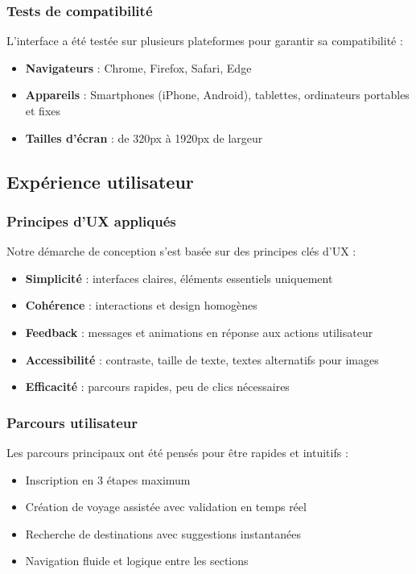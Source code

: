 \documentclass[a4paper,12pt]{article}
\begin{document}
\subsubsection{Tests de compatibilité}
L’interface a été testée sur plusieurs plateformes pour garantir sa compatibilité :
\begin{itemize}
  \item \textbf{Navigateurs} : Chrome, Firefox, Safari, Edge
  \item \textbf{Appareils} : Smartphones (iPhone, Android), tablettes, ordinateurs portables et fixes
  \item \textbf{Tailles d’écran} : de 320px à 1920px de largeur
\end{itemize}

\subsection{Expérience utilisateur}

\subsubsection{Principes d’UX appliqués}
Notre démarche de conception s’est basée sur des principes clés d’UX :
\begin{itemize}
  \item \textbf{Simplicité} : interfaces claires, éléments essentiels uniquement
  \item \textbf{Cohérence} : interactions et design homogènes
  \item \textbf{Feedback} : messages et animations en réponse aux actions utilisateur
  \item \textbf{Accessibilité} : contraste, taille de texte, textes alternatifs pour images
  \item \textbf{Efficacité} : parcours rapides, peu de clics nécessaires
\end{itemize}

\subsubsection{Parcours utilisateur}
Les parcours principaux ont été pensés pour être rapides et intuitifs :
\begin{itemize}
  \item Inscription en 3 étapes maximum
  \item Création de voyage assistée avec validation en temps réel
  \item Recherche de destinations avec suggestions instantanées
  \item Navigation fluide et logique entre les sections
\end{itemize}
\end{document}
